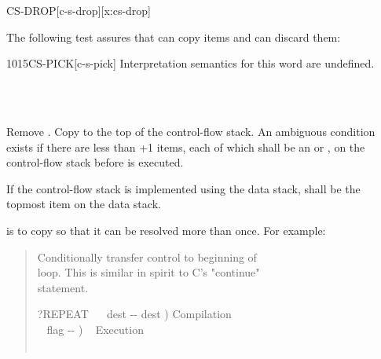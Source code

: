 \begin{worddef*}{}{CS-DROP}[c-s-drop][x:cs-drop]
\begin{testing}

		The following test assures that  can copy  items
		and  can discard them:

	\end{testing}
\end{worddef*}


\begin{worddef}{1015}{CS-PICK}[c-s-pick]
\interpret
	Interpretation semantics for this word are undefined.

\execute
\cbstart{}%
	 \\
	 \\
\cbend

	Remove . Copy  to the top of the
	control-flow stack. An ambiguous condition exists if there
	are less than +1 items, each of which shall be an
	 or , on the control-flow stack
	before  is executed.

	If the control-flow stack is implemented using the data stack,
	 shall be the topmost item on the data stack.

	\begin{rationale} %
		 is to copy
                  so that it can be resolved more than
                once. For example: 
		\begin{quote}\ttfamily
			 Conditionally transfer control to beginning of \\
			 loop.  This is similar in spirit to C's "continue" \\
			 statement.

			\word{:} ?REPEAT ~~ dest -{}- dest )  Compilation \\
			\tab\tab\tab~ flag -{}- ) \tab~ Execution \\
			  ~   \\
			\word{;} 


\end{quote}
\end{rationale}
\end{worddef}

